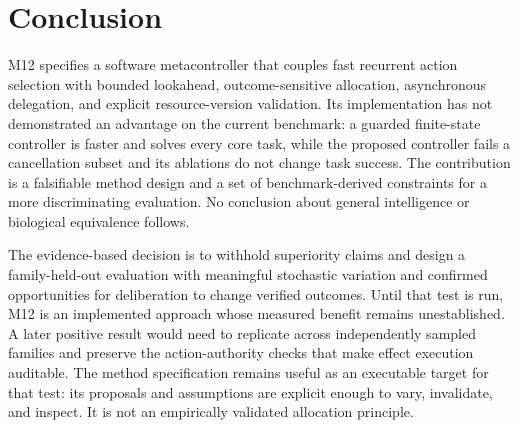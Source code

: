 \documentclass[11pt]{article}
\begin{document}
\section{Conclusion}
M12 specifies a software metacontroller that couples fast recurrent action selection with bounded lookahead, outcome-sensitive allocation, asynchronous delegation, and explicit resource-version validation. Its implementation has not demonstrated an advantage on the current benchmark: a guarded finite-state controller is faster and solves every core task, while the proposed controller fails a cancellation subset and its ablations do not change task success. The contribution is a falsifiable method design and a set of benchmark-derived constraints for a more discriminating evaluation. No conclusion about general intelligence or biological equivalence follows.

The evidence-based decision is to withhold superiority claims and design a family-held-out evaluation with meaningful stochastic variation and confirmed opportunities for deliberation to change verified outcomes. Until that test is run, M12 is an implemented approach whose measured benefit remains unestablished. A later positive result would need to replicate across independently sampled families and preserve the action-authority checks that make effect execution auditable.
The method specification remains useful as an executable target for that test: its proposals and assumptions are explicit enough to vary, invalidate, and inspect. It is not an empirically validated allocation principle.
\end{document}
